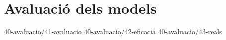 \chapter{Avaluació dels models}

{40-avaluacio/41-avaluacio}
{40-avaluacio/42-eficacia}
{40-avaluacio/43-reals}

